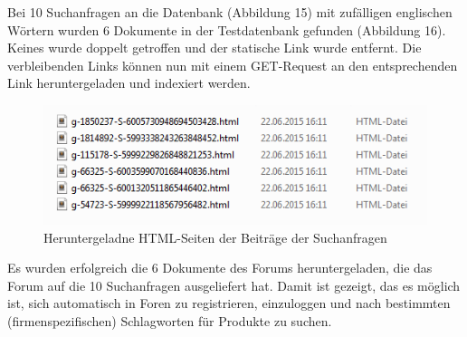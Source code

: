 Bei 10 Suchanfragen an die Datenbank (Abbildung 15) mit zufälligen englischen Wörtern wurden 6 Dokumente in der Testdatenbank gefunden (Abbildung 16). Keines wurde doppelt getroffen und der statische Link wurde entfernt. Die verbleibenden Links können nun mit einem GET-Request an den entsprechenden Link heruntergeladen und indexiert werden.
\newpage

\begin{figure}[h!]
\includegraphics{./images/postdownload.png}
\caption{Heruntergeladne HTML-Seiten der Beiträge der Suchanfragen}
\end{figure}


Es wurden erfolgreich die 6 Dokumente des Forums heruntergeladen, die das Forum auf die 10 Suchanfragen ausgeliefert hat.
Damit ist gezeigt, das es möglich ist, sich automatisch in Foren zu registrieren, einzuloggen und nach bestimmten (firmenspezifischen) Schlagworten für Produkte zu suchen.
\newpage

